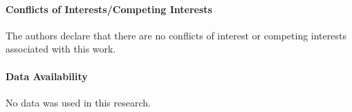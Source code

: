 \documentclass[12pt, a4paper]{amsart}
\newcommand{\R}{\mathbb{R}}
\newcommand{\E}{\mathcal{E}}
\begin{document}
\paragraph{\bf Conflicts of Interests/Competing Interests} 
The authors declare that there are no conflicts of interest or competing interests associated with this work.

\paragraph{\bf Data Availability} 
No data was used in this research.




%
%
\end{document}
